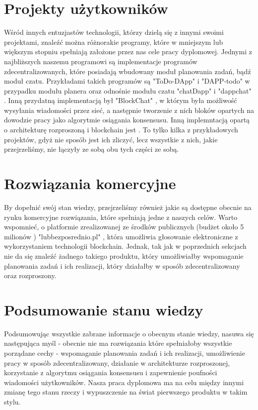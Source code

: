 \section{Projekty użytkowników}
\label{sec:ProjektyUzytkownikow}
Wśród innych entuzjastów technologii, którzy dzielą się z innymi swoimi projektami, znaleźć można różnorakie programy, które w mniejszym lub większym stopniu spełniają założone przez nas cele pracy dyplomowej. Jednymi z najbliższych naszemu programowi są implementacje programów zdecentralizowanych, które posiadają wbudowany moduł planowania zadań, bądź moduł czatu. Przykładami takich programów są "ToDo-DApp" \cite{ToDo_DApp} i "DAPP-todo" \cite{DAPP_todo} w przypadku modułu planera oraz odnośnie modułu czatu "chatDapp" \cite{chatDapp} i "dappchat" \cite{dappchat}. Inną przydatną implementacją był "BlockChat" \cite{blockchat}, w którym była możliwość wysyłania wiadomości przez sieć, a następnie tworzenie z nich bloków opartych na dowodzie pracy jako algorytmie osiągania konsensusu. Inną implemntacją opartą o architekturę rozproszoną i blockchain jest \cite{PythonBlockchain}. To tylko kilka z przykładowych projektów, gdyż nie sposób jest ich zliczyć, lecz wszystkie z nich, jakie przejrzeliśmy, nie łączyły ze sobą obu tych części ze sobą.%

\section{Rozwiązania komercyjne}
\label{sec:RozwiazaniaKomercyjne}
By dopełnić swój stan wiedzy, przejrzeliśmy również jakie są dostępne obecnie na rynku komercyjne rozwiązania, które spełniają jedne z naszych celów. Warto wspomnieć, o platformie zrealizowanej ze środków publicznych (budżet około 5 milionów \cite{IDB})  "lubbezposrednio.pl" \cite{lubBezPosrednio}, która umożliwia głosowanie elektroniczne z wykorzystaniem technologii blockchain. Jednak, tak jak w poprzednich sekcjach nie da się znaleźć żadnego takiego produktu, który umożliwiałby wspomaganie planowania zadań i ich realizacji, który działałby w sposób zdecentralizowany oraz rozproszony. %

\section{Podsumowanie stanu wiedzy}
\label{sec:PodsumowanieWiedzy}
Podsumowując wszystkie zabrane informacje o obecnym stanie wiedzy, nasuwa się następująca myśl - obecnie nie ma rozwiązania które spełniałoby wszystkie porządane cechy - wspomaganie planowania zadań i ich realizacji, umożliwienie pracy w sposób zdecentralizowany, działanie w architekturze rozproszonej, korzystanie z algorytmu osiągania konsensusu i zapewnienie poufności wiadomości użytkowników. Nasza praca dyplomowa ma na celu między innymi zmianę tego stanu rzeczy i wypuszczenie na świat pierwszego produktu w takim stylu.